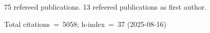 75 refereed publications. 13 refeered publications as first author.

Total citations~=~5058; h-index~=~37 (2025-08-16)